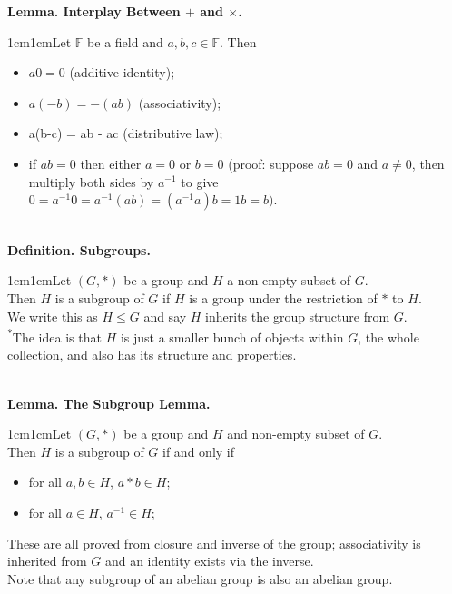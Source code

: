 \documentclass{article}
\newcommand{\definition}[2]{\textbf{Definition. #1.}\begin{adjustwidth}{1cm}{1cm}#2\end{adjustwidth}}
\newcommand{\lemma}[2]{\textbf{Lemma. #1.}\begin{adjustwidth}{1cm}{1cm}#2\end{adjustwidth}}
\begin{document}
\lemma{Interplay Between $+$ and $\times$}{Let $\mathbb{F}$ be a field and $a,b,c \in \mathbb{F}$. Then\begin{itemize}\item $a0 = 0$ (additive identity); \item $a(-b) = -(ab)$ (associativity); \item a(b-c) = ab - ac (distributive law); \item if $ab = 0$ then either $a = 0$ or $b = 0$ (proof: suppose $ab = 0$ and $a \neq 0$, then multiply both sides by $a^{-1}$ to give $0 = a^{-1}0 = a^{-1}(ab) = (a^{-1}a)b = 1b = b)$.\end{itemize}}~\\
\definition{Subgroups}{Let $(G,*)$ be a group and $H$ a non-empty subset of $G$.\\Then $H$ is a subgroup of $G$ if $H$ is a group under the restriction of $*$ to $H$.\\We write this as $H \leq G$ and say $H$ inherits the group structure from $G$.\\[1\baselineskip]\textsuperscript{*}The idea is that $H$ is just a smaller bunch of objects within $G$, the whole collection, and also has its structure and properties.}~\\
\lemma{The Subgroup Lemma}{Let $(G, *)$ be a group and $H$ and non-empty subset of $G$.\\Then $H$ is a subgroup of $G$ if and only if \begin{itemize}
  \item for all $a,b \in H$, $a * b \in H$;
  \item for all $a \in H$, $a^{-1} \in H$;
\end{itemize}These are all proved from closure and inverse of the group; associativity is inherited from $G$ and an identity exists via the inverse.\\[1\baselineskip]Note that any subgroup of an abelian group is also an abelian group.}~\\
\end{document}
